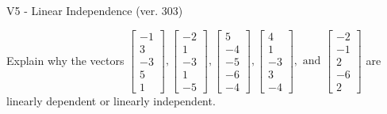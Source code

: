 \begin{exercise}
  \begin{exerciseTitle}V5 - Linear Independence (ver. 303)\end{exerciseTitle}
  \begin{exerciseStatement}
    Explain why the vectors \(\left[\begin{array}{r}
-1 \\
3 \\
-3 \\
5 \\
1
\end{array}\right] , \left[\begin{array}{r}
-2 \\
1 \\
-3 \\
1 \\
-5
\end{array}\right] , \left[\begin{array}{r}
5 \\
-4 \\
-5 \\
-6 \\
-4
\end{array}\right] , \left[\begin{array}{r}
4 \\
1 \\
-3 \\
3 \\
-4
\end{array}\right] , \text{ and } \left[\begin{array}{r}
-2 \\
-1 \\
2 \\
-6 \\
2
\end{array}\right]\) are linearly dependent or linearly independent.	



\end{exerciseStatement}
\end{exercise}
